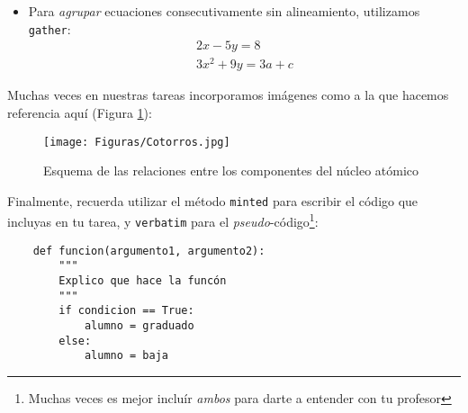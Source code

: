 \documentclass{assignment}
\begin{document}
\begin{problem}
\begin{itemize}
    \item Para \textit{agrupar} ecuaciones consecutivamente sin alineamiento, utilizamos \texttt{gather}:
    \begin{gather*} 
        2x - 5y =  8 \\ 
        3x^2 + 9y =  3a + c
    \end{gather*}
\end{itemize}

\noindent Muchas veces en nuestras tareas incorporamos imágenes como a la que hacemos referencia aquí (Figura \ref{fig:yo_en_la_vida}):
\begin{figure}[ht] %
    \centering
    \texttt{[image: Figuras/Cotorros.jpg]} %
    \caption{Esquema de las relaciones entre los componentes del núcleo atómico}
    \label{fig:yo_en_la_vida}
\end{figure}

\noindent Finalmente, recuerda utilizar el método \texttt{minted} para escribir el código que incluyas en tu tarea, y \texttt{verbatim} para el \textit{pseudo}-código\footnote{Muchas veces es mejor incluír \textit{ambos} para darte a entender con tu profesor}:

\begin{verbatim}
    def funcion(argumento1, argumento2):
        """
        Explico que hace la funcón
        """
        if condicion == True:
            alumno = graduado
        else:
            alumno = baja
\end{verbatim}

\end{problem}


    




\newpage

\nocite{*} %

\end{document}
